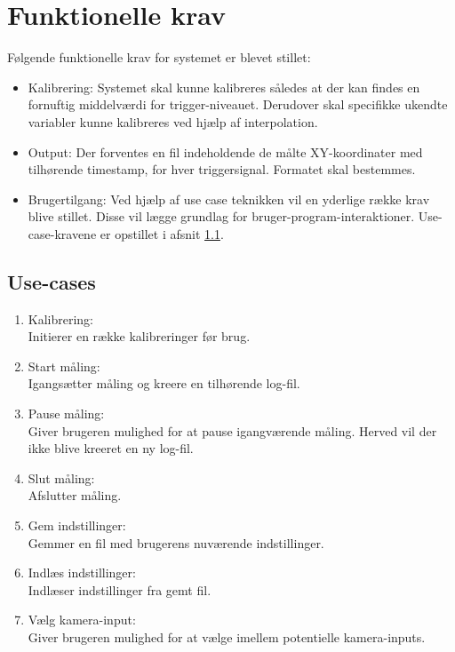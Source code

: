 \documentclass[kravspec.tex]{subfiles}
\begin{document}
\section{Funktionelle krav}
Følgende funktionelle krav for systemet er blevet stillet: \\
\begin{itemize}
	\item 
	Kalibrering: Systemet skal kunne kalibreres således at der kan findes en fornuftig middelværdi for trigger-niveauet. Derudover skal specifikke ukendte variabler kunne kalibreres ved hjælp af interpolation.  
	\item
	Output: Der forventes en fil indeholdende de målte XY-koordinater med tilhørende timestamp, for hver triggersignal. Formatet skal bestemmes.
	\item
	Brugertilgang: Ved hjælp af use case teknikken vil en yderlige række krav blive stillet. Disse vil lægge grundlag for bruger-program-interaktioner. Use-case-kravene er opstillet i afsnit \ref{usec}.  
\end{itemize}

\subsection{Use-cases}	
\label{usec}
\begin{enumerate}
	\item Kalibrering: \\Initierer en række kalibreringer før brug. 
	\item Start måling: \\Igangsætter måling og kreere en tilhørende log-fil.
	\item Pause måling: \\Giver brugeren mulighed for at pause igangværende måling. Herved vil der ikke blive kreeret en ny log-fil. 
	\item Slut måling: \\Afslutter måling.
	\item Gem indstillinger: \\Gemmer en fil med brugerens nuværende indstillinger.
	\item Indlæs indstillinger: \\Indlæser indstillinger fra gemt fil.
	\item Vælg kamera-input: \\ Giver brugeren mulighed for at vælge imellem potentielle kamera-inputs.

\end{enumerate}
	
\end{document}
